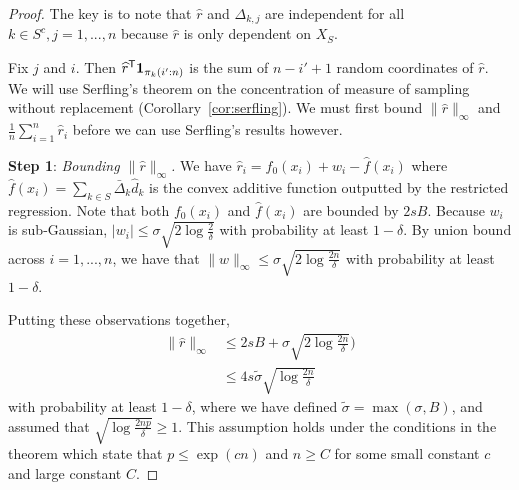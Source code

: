 \begin{proof}
The key is to note that $\hat{r}$ and $\Delta_{k,j}$ are independent for all $k \in S^c,j=1,...,n$ because $\hat{r}$ is only dependent on $X_{S}$.

Fix $j$ and $i$. Then $\widehat{r}^{\mathsf{T}} \mbox{\boldmath $1$}_{\pi_k(i':n)}$ is the sum
of $n-i'+1$ random coordinates of $\hat{r}$. We will use
Serfling's theorem on the concentration of measure of sampling without
replacement (Corollary~\ref{cor:serfling}). We must first bound $\|
\hat{r} \|_\infty$ and $\frac{1}{n} \sum_{i=1}^n \hat{r}_i$ before we
can use Serfling's results however.

\vskip5pt
\textbf{Step 1}: {\it Bounding $\| \hat{r} \|_\infty$.} We have $\hat{r}_i = f_0(x_i) + w_i - \hat{f}(x_i)$ where
$\hat{f}(x_i) = \sum_{k \in S} \bar{\Delta}_k \hat{d}_k$ is the convex
additive function outputted by the restricted regression. Note that
both $f_0(x_i)$ and $\hat{f}(x_i)$ are bounded by $2sB$. 
Because $w_i$ is sub-Gaussian, $|w_i| \leq  \sigma \sqrt{2\log \frac{2}{\delta}}$ with probability at least $1-\delta$. By union bound across $i=1,...,n$, we have that $\| w\|_\infty \leq \sigma \sqrt{ 2 \log \frac{2n}{\delta}}$ with probability at least $1 - \delta$.

Putting these observations together,
\begin{align}
\| \hat{r} \|_\infty &\leq 2sB + \sigma \sqrt{ 2\log \frac{2n}{\delta}}) \nonumber \\
      &\leq 4 s \tilde{\sigma} \sqrt{\log \frac{2n}{\delta}} \label{eqn:stepone_rhat}
\end{align}
with probability at least $1 - \delta$, where we have defined
$\tilde{\sigma} = \max(\sigma, B)$,
and assumed that $\sqrt{\log \frac{2np}{\delta}} \geq 1$. This assumption holds under the conditions in the theorem which state that $p \leq \exp( c n)$ and $n \geq C$ for some small constant $c$ and large constant $C$.


\end{proof}
